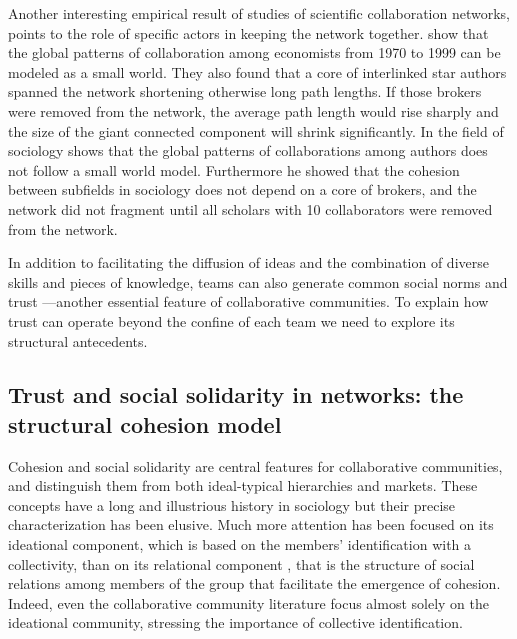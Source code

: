 Another interesting empirical result of studies of scientific collaboration networks, points to the role of specific actors in keeping the network together. \citet*{goyal:2006} show that the global patterns of collaboration among economists from 1970 to 1999 can be modeled as a small world. They also found that a core of interlinked star authors spanned the network shortening otherwise long path lengths. If those brokers were removed from the network, the average path length would rise sharply and the size of the giant connected component will shrink significantly. In the field of sociology \citet{moody:2004} shows that the global patterns of collaborations among authors does not follow a small world model. Furthermore he showed that the cohesion between subfields in sociology does not depend on a core of brokers, and the network did not fragment until all scholars with 10 collaborators were removed from the network.

In addition to facilitating the diffusion of ideas and the combination of diverse skills and pieces of knowledge, teams can also generate common social norms and trust ---another essential feature of collaborative communities.  To explain how trust can operate beyond the confine of each team we need to explore its structural antecedents.

\subsection{Trust and social solidarity in networks: the structural cohesion model}
\label{scm}

Cohesion and social solidarity are central features for collaborative communities, and distinguish them from both ideal-typical hierarchies and markets. These concepts have a long and illustrious history in sociology \citep{durkheim:2008} but their precise characterization has been elusive. Much more attention has been focused on its ideational component, which is based on the members' identification with a collectivity, than on its relational component \citep{doreian:1998}, that is the structure of social relations among members of the group that facilitate the emergence of cohesion. Indeed, even the collaborative community literature focus almost solely on the ideational community, stressing the importance of collective identification.

